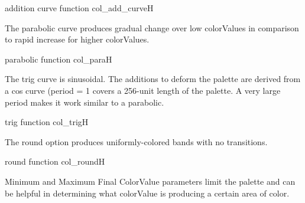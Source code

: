{addition curve function}
{col_add_curve}{H}

The parabolic curve produces gradual change over low colorValues in comparison to rapid increase for higher colorValues.

{parabolic function}
{col_para}{H}

The trig curve is sinusoidal. The additions to deform the palette are derived from a cos curve (period = 1 covers a 256-unit length of the palette. A very large period makes it work similar to a parabolic.

{trig function}
{col_trig}{H}

The round option produces uniformly-colored bands with no transitions.

{round function}
{col_round}{H}

Minimum and Maximum Final ColorValue parameters limit the palette and can be helpful in determining what colorValue is producing a certain area of color.







